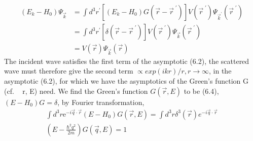 \begin{equation}
\begin{aligned}\left(E_{k}-H_{0}\right) \Psi_{\vec{k}} &=\int d^{3} r^{\prime}\left[\left(E_{k}-H_{0}\right) G\left(\vec{r}-\vec{r}^{\;\prime}\right)\right] V\left(\vec{r}^{\;\prime}\right) \Psi_{\vec{k}^{\prime}}\left(\vec{r}^{\;\prime}\right) \\ &=\int d^{3} r^{\prime}\left[\delta\left(\vec{r}-\vec{r}^{\;\prime}\right)\right] V\left(\vec{r}^{\;\prime}\right) \Psi_{\vec{k}}\left(\vec{r}^{\;\prime}\right) \\ &=V(\vec{r}) \Psi_{\vec{k}}(\vec{r}) \end{aligned}
\end{equation}
The incident wave satisfies the first term of the asymptotic (6.2), the scattered wave must therefore give the second term $\propto exp (ikr) / r, r \rightarrow\infty$, in the asymptotic (6.2), for which we have the asymptotics of the Green's function G (cf. ~ r, E) need. We find the Green's function $G (\vec{r}, E)$ to be (6.4), $(E - H_0) G = \delta$, by Fourier transformation,
\begin{equation}
\begin{array}{c}{\int d^{3} r \mathrm{e}^{-i \vec{q} \cdot \vec{r}}\left(E-H_{0}\right) G(\vec{r}, E)=\int d^{3} r \delta^{3}(\vec{r}) e^{-i \vec{q} \cdot \vec{r}}} \\ {\left(E-\frac{\hbar^{2} q^{2}}{2 m}\right) G(\vec{q}, E)=1}\end{array}
\end{equation}

